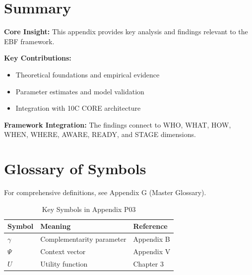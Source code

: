 \section{Summary}
\label{sec:p03-summary}

\begin{tcolorbox}[colback=gray!5!white, colframe=gray!75!black,
    title=Appendix P03 Summary]

\textbf{Core Insight:}
This appendix provides key analysis and findings relevant to the EBF framework.

\textbf{Key Contributions:}
\begin{itemize}[nosep]
    \item Theoretical foundations and empirical evidence
    \item Parameter estimates and model validation
    \item Integration with 10C CORE architecture
\end{itemize}

\textbf{Framework Integration:}
The findings connect to WHO, WHAT, HOW, WHEN, WHERE, AWARE, READY, and STAGE dimensions.

\end{tcolorbox}

\section{Glossary of Symbols}
\label{sec:p03-glossary}

For comprehensive definitions, see Appendix G (Master Glossary).

\begin{table}[htbp]
\centering
\caption{Key Symbols in Appendix P03}
\begin{tabular}{lll}
\toprule
\textbf{Symbol} & \textbf{Meaning} & \textbf{Reference} \\
\midrule
$\gamma$ & Complementarity parameter & Appendix B \\
$\Psi$ & Context vector & Appendix V \\
$U$ & Utility function & Chapter 3 \\
\bottomrule
\end{tabular}
\end{table}



